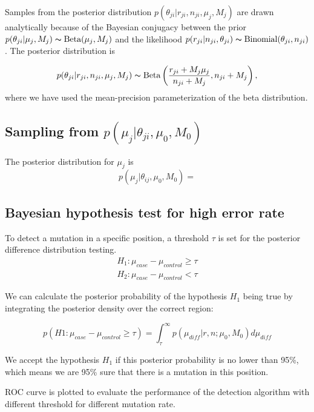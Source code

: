 \documentclass[11pt,reqno]{amsart}
\begin{document}
Samples from the posterior distribution $p(\theta_{ji} | r_{ji}, n_{ji}, \mu_j, M_j)$ are drawn analytically because of the Bayesian conjugacy between the prior $p(\theta_{ji} | \mu_j, M_j) \thicksim \text{Beta}(\mu_j, M_j)$ and the likelihood $p(r_{ji} | n_{ji}, \theta_{ji}) \thicksim \text{Binomial}(\theta_{ji}, n_{ji})$. The posterior distribution is 

\begin{equation}
	p(\theta_{ji} | r_{ji}, n_{ji}, \mu_j, M_j) \thicksim \text{Beta}\left( \frac{r_{ji} + M_j \mu_j}{n_{ji} + M_j} , n_{ji} + M_j\right),
\end{equation}
where we have used the mean-precision parameterization of the beta distribution.

\subsection{Sampling from $p \left( \mu_j |\theta_{ji},\mu_0,M_0\right)$}

The posterior distribution for $\mu_j$ is
\begin{equation}
	p \left( \mu_j |\theta_{ij},\mu_0,M_0\right) = 
\end{equation}
\subsection{Bayesian hypothesis test for high error rate}

To detect a mutation in a specific position, a threshold $\tau$ is set for the posterior difference distribution testing.
\begin{align}
 H_1: \mu_{case}-\mu_{control}\geq\tau \\
 H_2: \mu_{case}-\mu_{control}<\tau
\end{align}

We can calculate the posterior probability of the hypothesis $H_1$ being true by integrating the posterior density over the correct region:

\begin{equation}
 p(H1:\mu_{case}-\mu_{control}\geq\tau)=\int_\tau^\infty p(\mu_{diff} |r,n; \mu_0,M_0)d\mu_{diff}
\end{equation}

We accept the hypothesis $H_1$ if this posterior probability is no lower than 95\%, which means we are 95\% sure that there is a mutation in this position.

ROC curve is plotted to evaluate the performance of the detection algorithm with different threshold for different mutation rate. 
\end{document}

